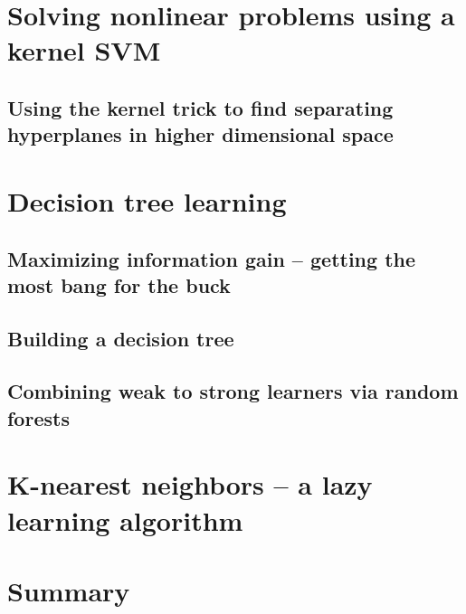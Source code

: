 \documentclass{report}
\begin{document}
\section{Solving nonlinear problems using a kernel SVM}
\subsection{Using the kernel trick to find separating hyperplanes in higher dimensional space}
\section{Decision tree learning}
\subsection{Maximizing information gain -- getting the most bang for the buck}
\subsection{Building a decision tree}
\subsection{Combining weak to strong learners via random forests}
\section{K-nearest neighbors -- a lazy learning algorithm}
\section{Summary}
\end{document}
